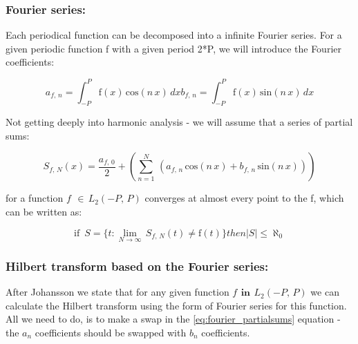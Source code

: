 \documentclass[12pt,twoside,a4paper]{article}
\numberwithin{equation}{subsection}
\numberwithin{figure}{subsection}
\begin{document}
\subsubsection*{Fourier series:} 

Each periodical function can be decomposed into a infinite Fourier series. For a given periodic function f with a given period 2*P,
we will introduce the Fourier coefficients:

\begin{subequations} \label{eq:fourier_coeffs}
  \begin{equation}   \label{eq:fcoeffs_an}
    {a_{f, \,n}}=\int_{ - P}^{P}\mathrm{f}(x)\,\mathrm{cos}(n\,x)\, dx
  \end{equation}
  \begin{equation}   \label{eq:fcoeffs_bn}
    {b_{f, \,n}}=\int_{ - P}^{P}\mathrm{f}(x)\,\mathrm{sin}(n\,x)\, dx
  \end{equation}
\end{subequations}

Not getting deeply into harmonic analysis - we will assume that a series of partial sums:

\begin{equation} \label{eq:fourier_partialsums}
  {S_{f, \,N}}(x)=\frac {{a_{f, \,0}}}{2} + (\sum_{n=1}^{N}\,({a
_{f, \,n}}\,\mathrm{cos}(n\,x) + {b_{f, \,n}}\,\mathrm{sin}(n\,x)
))
\end{equation}

for a function $f\,\ \in \,{L_{2}}( - P, \,P)$ converges at almost every point to the f, which can be written as:

\begin{equation} \label{eq:fourier_canbewritten}
  \mbox{if }\,S = \{t : \lim_{N\rightarrow \infty }\,{S_{f, \,N}}(t) \neq \mathrm{f}(t) \} then |S| \leq {\aleph_{0}}
\end{equation}

\subsubsection*{Hilbert transform based on the Fourier series:}

After Johansson \cite{johansson_hilbert} we state that for any given function $f\,\ \textbf{in}\ \,{L_{2}}( - P, \,P)$ we can
calculate the Hilbert transform using the form of Fourier series for this function. All we need to do, is to make a swap in the
\ref{eq:fourier_partialsums} equation - the ${a_{n}}$ coefficients should be swapped with ${b_{n}}$ coefficients.
\end{document}
